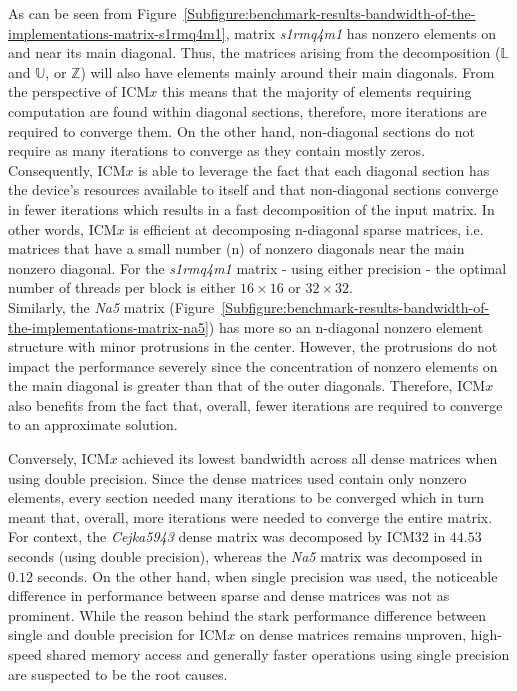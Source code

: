 As can be seen from Figure~\ref{Subfigure:benchmark-results-bandwidth-of-the-implementations-matrix-s1rmq4m1}, matrix \textit{s1rmq4m1} has nonzero elements on and near its main diagonal. Thus, the matrices arising from the decomposition ($ \mathbb{L} $ and $ \mathbb{U} $, or $ \mathbb{Z} $) will also have elements mainly around their main diagonals. From the perspective of ICM$ x $ this means that the majority of elements requiring computation are found within diagonal sections, therefore, more iterations are required to converge them. On the other hand, non-diagonal sections do not require as many iterations to converge as they contain mostly zeros. Consequently, ICM$ x $ is able to leverage the fact that each diagonal section has the device's resources available to itself and that non-diagonal sections converge in fewer iterations which results in a fast decomposition of the input matrix. In other words, ICM$ x $ is efficient at decomposing n-diagonal sparse matrices, i.e. matrices that have a small number (n) of nonzero diagonals near the main nonzero diagonal. For the \textit{s1rmq4m1} matrix - using either precision - the optimal number of threads per block is either $ 16 \times 16 $ or $ 32 \times 32 $. \\
Similarly, the \textit{Na5} matrix (Figure~\ref{Subfigure:benchmark-results-bandwidth-of-the-implementations-matrix-na5}) has more so an n-diagonal nonzero element structure with minor protrusions in the center. However, the protrusions do not impact the performance severely since the concentration of nonzero elements on the main diagonal is greater than that of the outer diagonals. Therefore, ICM$ x $ also benefits from the fact that, overall, fewer iterations are required to converge to an approximate solution.
\par Conversely, ICM$ x $ achieved its lowest bandwidth across all dense matrices when using double precision. Since the dense matrices used contain only nonzero elements, every section needed many iterations to be converged which in turn meant that, overall, more iterations were needed to converge the entire matrix. For context, the \textit{Cejka5943} dense matrix was decomposed by ICM32 in $ 44.53 $ seconds (using double precision), whereas the \textit{Na5} matrix was decomposed in $ 0.12 $ seconds. On the other hand, when single precision was used, the noticeable difference in performance between sparse and dense matrices was not as prominent. While the reason behind the stark performance difference between single and double precision for ICM$ x $ on dense matrices remains unproven, high-speed shared memory access and generally faster operations using single precision are suspected to be the root causes.
